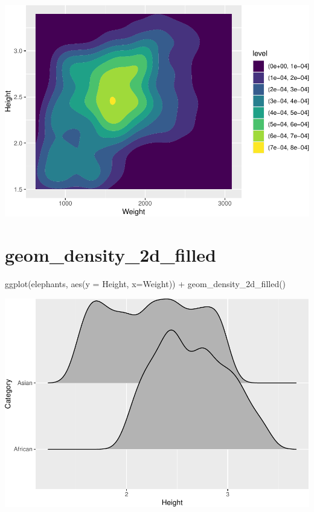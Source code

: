 \documentclass[
]{book}
\newenvironment{Shaded}{\begin{snugshade}}{\end{snugshade}}
\newcommand{\AttributeTok}[1]{\textcolor[rgb]{0.77,0.63,0.00}{#1}}
\newcommand{\FunctionTok}[1]{\textcolor[rgb]{0.00,0.00,0.00}{#1}}
\newcommand{\NormalTok}[1]{#1}
\newcommand{\SpecialCharTok}[1]{\textcolor[rgb]{0.00,0.00,0.00}{#1}}
\begin{document}
\includegraphics{Data-Visualisation-geom-Encyclopedia_files/figure-latex/unnamed-chunk-33-1.pdf}

\hypertarget{geom_density_2d_filled}{%
\section{geom\_density\_2d\_filled}\label{geom_density_2d_filled}}

\begin{Shaded}
\begin{Highlighting}[]
\FunctionTok{ggplot}\NormalTok{(elephants, }\FunctionTok{aes}\NormalTok{(}\AttributeTok{y =}\NormalTok{ Height, }\AttributeTok{x=}\NormalTok{Weight)) }\SpecialCharTok{+} 
  \FunctionTok{geom\_density\_2d\_filled}\NormalTok{()}
\end{Highlighting}
\end{Shaded}

\includegraphics{Data-Visualisation-geom-Encyclopedia_files/figure-latex/unnamed-chunk-34-1.pdf}
\end{document}
